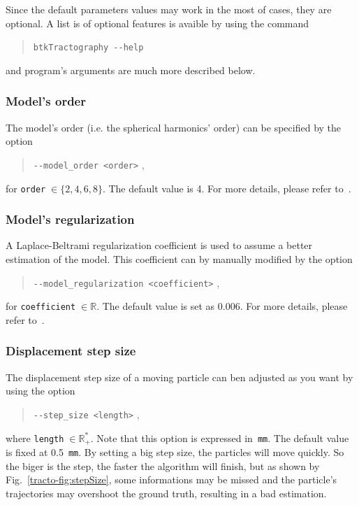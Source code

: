         Since the default parameters values may work in the most of cases, they are optional. A list is of optional features is avaible by using the command
            \begin{quote}
                \texttt{btkTractography -\hspace{0.1mm}-help}
            \end{quote}
        and program's arguments are much more described below.


    \subsubsection*{Model's order}
        The model's order (i.e. the spherical harmonics' order) can be specified by the option
            \begin{quote}
                \texttt{-\hspace{0.1mm}-model\_order <order>} \enspace ,
            \end{quote}
        for \texttt{order}$\;\in\{2,4,6,8\}$. The default value is 4. For more details, please refer to~\cite{descoteaux_regularized_2007}.

    \subsubsection*{Model's regularization}
        A Laplace-Beltrami regularization coefficient is used to assume a better estimation of the model. This coefficient can by manually modified by the option
            \begin{quote}
                \texttt{-\hspace{0.1mm}-model\_regularization <coefficient>} \enspace ,
            \end{quote}
        for \texttt{coefficient}$\;\in\mathbb{R}$. The default value is set as 0.006. For more details, please refer to~\cite{descoteaux_regularized_2007}.

    \subsubsection*{Displacement step size}
        The displacement step size of a moving particle can ben adjusted as you want by using the option
            \begin{quote}
                \texttt{-\hspace{0.1mm}-step\_size <length>} \enspace ,
            \end{quote}
        where \texttt{length}$\;\in\mathbb{R}_+^*$. Note that this option is expressed in~\texttt{mm}. The default value is fixed at 0.5~\texttt{mm}.
        By setting a big step size, the particles will move quickly. So the biger is the step, the faster the algorithm will finish, but as shown by Fig.~\ref{tracto-fig:stepSize}, some informations may be missed and the particle's trajectories may overshoot the ground truth, resulting in a bad estimation.

